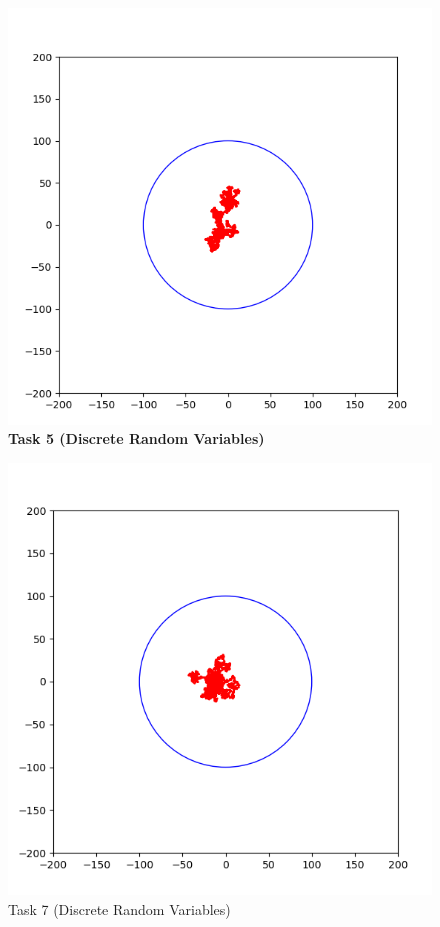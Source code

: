 \documentclass{article}
\begin{document}
    \begin{figure}[H]
        \includegraphics[width=15cm]{Graphs/task5.png}
        \centering
        \caption{\textbf{Task 5 (Discrete Random Variables)}}
    \end{figure}
    \begin{figure}[H]
        \includegraphics[width=15cm]{Graphs/task7.png}
        \centering
        \caption{Task 7 (Discrete Random Variables)}
    \end{figure}
\end{document}

